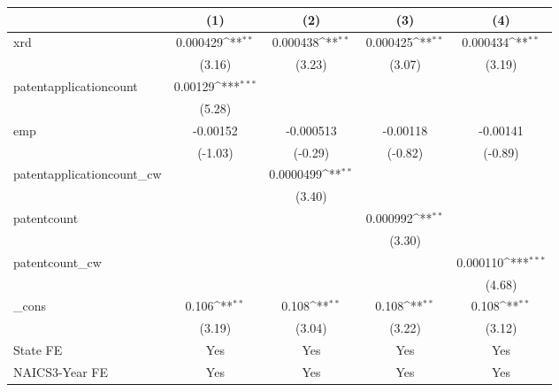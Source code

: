 {
\def\sym#1{\ifmmode^{#1}\else\(^{#1}\)\fi}
\begin{tabular}{l*{4}{c}}
\hline\hline
            &\multicolumn{1}{c}{(1)}         &\multicolumn{1}{c}{(2)}         &\multicolumn{1}{c}{(3)}         &\multicolumn{1}{c}{(4)}         \\
\hline
xrd         &    0.000429\sym{**} &    0.000438\sym{**} &    0.000425\sym{**} &    0.000434\sym{**} \\
            &      (3.16)         &      (3.23)         &      (3.07)         &      (3.19)         \\
[1em]
patentapplicationcount&     0.00129\sym{***}&                     &                     &                     \\
            &      (5.28)         &                     &                     &                     \\
[1em]
emp         &    -0.00152         &   -0.000513         &    -0.00118         &    -0.00141         \\
            &     (-1.03)         &     (-0.29)         &     (-0.82)         &     (-0.89)         \\
[1em]
patentapplicationcount\_cw&                     &   0.0000499\sym{**} &                     &                     \\
            &                     &      (3.40)         &                     &                     \\
[1em]
patentcount &                     &                     &    0.000992\sym{**} &                     \\
            &                     &                     &      (3.30)         &                     \\
[1em]
patentcount\_cw&                     &                     &                     &    0.000110\sym{***}\\
            &                     &                     &                     &      (4.68)         \\
[1em]
\_cons      &       0.106\sym{**} &       0.108\sym{**} &       0.108\sym{**} &       0.108\sym{**} \\
            &      (3.19)         &      (3.04)         &      (3.22)         &      (3.12)         \\
[1em]
State FE    &         Yes         &         Yes         &         Yes         &         Yes         \\
[1em]
NAICS3-Year FE&         Yes         &         Yes         &         Yes         &         Yes         \\

\end{tabular}}
